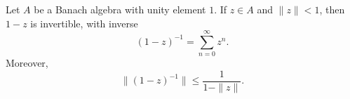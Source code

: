Let $A$ be a Banach algebra with unity element $1$. If $z \in A$ and $\|z\| < 1$, then $1 - z$ is invertible, with inverse
$$(1 - z)^{-1} = \sum_{n=0}^{\infty} z^n.$$
Moreover,
$$\|(1 - z)^{-1}\| \leq \frac{1}{1 - \|z\|}.$$
